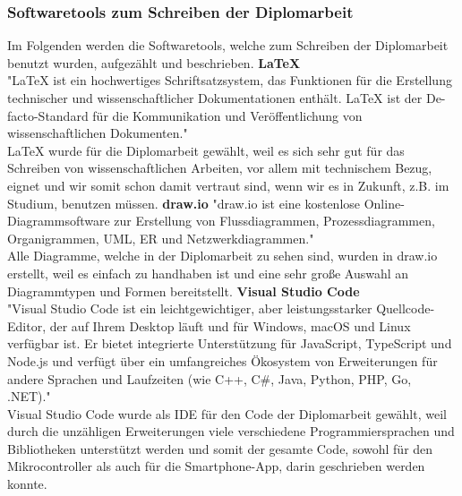 \documentclass[11pt, twoside]{article}
\begin{document}
\subsubsection{Softwaretools zum Schreiben der Diplomarbeit}
Im Folgenden werden die Softwaretools, welche zum Schreiben der Diplomarbeit benutzt wurden, aufgezählt und beschrieben.
\vspace{4mm}\newline
\textbf{\LaTeX} \\
"LaTeX ist ein hochwertiges Schriftsatzsystem, das Funktionen für die Erstellung technischer und wissenschaftlicher Dokumentationen enthält. LaTeX ist der De-facto-Standard für die Kommunikation und Veröffentlichung von wissenschaftlichen Dokumenten." \parencite{noauthor_urlpi29_nodate} \\
LaTeX wurde für die Diplomarbeit gewählt, weil es sich sehr gut für das Schreiben von wissenschaftlichen Arbeiten, vor allem mit technischem Bezug, eignet und wir somit schon damit vertraut sind, wenn wir es in Zukunft, z.B. im Studium, benutzen müssen.
\vspace{4mm}\newline
\textbf{draw.io}
"draw.io ist eine kostenlose Online-Diagrammsoftware zur Erstellung von Flussdiagrammen, Prozessdiagrammen, Organigrammen, UML, ER und Netzwerkdiagrammen." \parencite{noauthor_urlpi30_nodate} \\
Alle Diagramme, welche in der Diplomarbeit zu sehen sind, wurden in draw.io erstellt, weil es einfach zu handhaben ist und eine sehr große Auswahl an Diagrammtypen und Formen bereitstellt.
\vspace{4mm}\newline
\textbf{Visual Studio Code} \\
"Visual Studio Code ist ein leichtgewichtiger, aber leistungsstarker Quellcode-Editor, der auf Ihrem Desktop läuft und für Windows, macOS und Linux verfügbar ist. Er bietet integrierte Unterstützung für JavaScript, TypeScript und Node.js und verfügt über ein umfangreiches Ökosystem von Erweiterungen für andere Sprachen und Laufzeiten (wie C++, C\#, Java, Python, PHP, Go, .NET)." \parencite{noauthor_urlpi31_nodate} \\
Visual Studio Code wurde als IDE für den Code der Diplomarbeit gewählt, weil durch die unzähligen Erweiterungen viele verschiedene Programmiersprachen und Bibliotheken unterstützt werden und somit der gesamte Code, sowohl für den Mikrocontroller als auch für die Smartphone-App, darin geschrieben werden konnte.
\vspace{4mm}\newline
\end{document}
